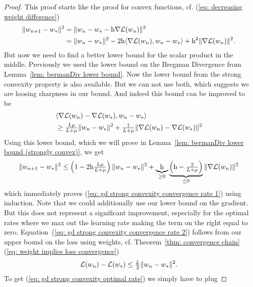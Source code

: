 \begin{proof}
	This proof starts like the proof for convex functions, cf. (\ref{eq:
	decreasing weight difference})
 \begin{align*}
		\|w_{n+1} - w_*\|^2
		&= \| w_n -w_* - \text{h}\nabla\mathcal{L}(w_n)\|^2\\
		&= \| w_n - w_*\|^2
		- 2\text{h}\langle \nabla\mathcal{L}(w_n), w_n - w_*\rangle
		+ \text{h}^2 \| \nabla\mathcal{L}(w_n)\|^2.
	\end{align*}
	But now we need to find a better lower bound for the scalar product in the
	middle. Previously we used the lower bound on the Bregman Divergence from
	Lemma~\ref{lem: bermanDiv lower bound}. Now the lower bound
	from the strong convexity property is also available. But we can not use
	both, which suggests we are loosing sharpness in our bound. And indeed this
	bound can be improved to be
 	\begin{align*}
		&\langle \nabla\mathcal{L}(w_n) -\nabla\mathcal{L}(w_*), w_n - w_*\rangle	\\
		&\ge \tfrac{L\mu}{L+\mu}\|w_n - w_*\|^2
		+ \tfrac{1}{L+\mu}
		\|\nabla\mathcal{L}(w_n) - \nabla\mathcal{L}(w_*)\|^2
	\end{align*}
	Using this lower bound, which we will prove in Lemma~\ref{lem: bermanDiv
	lower bound (strongly convex)}, we get
 \begin{align*}
		\|w_{n+1} - w_*\|^2
		\le \left(1- 2\text{h} \tfrac{L\mu}{L+\mu}\right)
		\|w_n - w_*\|^2
		+ \underbrace{\text{h}}_{\ge 0}
		\underbrace{\left(\text{h}-\tfrac{2}{L+\mu}\right)}_{\le0}
		\|\nabla\mathcal{L}(w_n)\|^2
	\end{align*}
	which immediately proves (\ref{eq: gd strong convexity convergence rate
	1}) using induction. Note that we could additionally use our lower bound on the
	gradient. But this does not represent a significant improvement,
	especially for the optimal rates where we max out the learning rate making
	the term on the right equal to zero. Equation~(\ref{eq: gd strong convexity
	convergence rate 2}) follows from our upper bound on the loss using weights,
	cf. Theorem~\ref{thm: convergence chain} (\ref{eq: weight implies loss convergence})
	\begin{align*}
		\mathcal{L}(w_n) - \mathcal{L}(w_*)
		\le \tfrac{L}{2} \| w_n - w_*\|^2.
	\end{align*}
	To get (\ref{eq: gd strong convexity optimal rate}) we simply have to plug

\end{proof}

